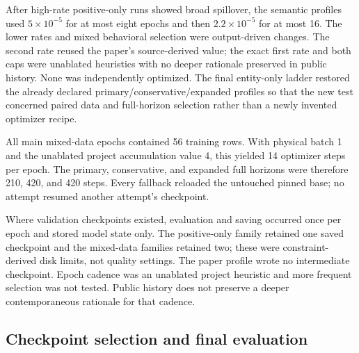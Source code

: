After high-rate positive-only runs showed broad spillover, the semantic
profiles used \(5\times10^{-5}\) for at most eight epochs and then
\(2.2\times10^{-5}\) for at most 16.  The lower rates and mixed behavioral
selection were output-driven changes.  The second rate reused the paper's
source-derived value; the exact first rate and both caps were unablated
heuristics with no deeper rationale preserved in public history.  None was
independently optimized.  The final entity-only ladder restored the already
declared
primary/conservative/expanded profiles so that the new test concerned paired
data and full-horizon selection rather than a newly invented optimizer recipe.
%
%

All main mixed-data epochs contained 56 training rows. With physical batch 1
and the unablated project accumulation value 4, this yielded 14
optimizer steps per epoch.  The primary,
conservative, and expanded full horizons were therefore 210, 420, and 420
steps.  Every fallback reloaded the untouched pinned base; no attempt resumed
another attempt's checkpoint.
%

Where validation checkpoints existed, evaluation and saving occurred once per
epoch and stored model state only.  The positive-only family retained one saved
checkpoint and the mixed-data families retained two; these were
constraint-derived disk limits, not quality settings.  The paper profile wrote
no intermediate checkpoint.  Epoch cadence was an unablated project heuristic
and more frequent selection was not tested. Public history does not preserve a
deeper contemporaneous rationale for that cadence.
%
%

\subsection{Checkpoint selection and final evaluation}
\label{sec:evaluation-method}


